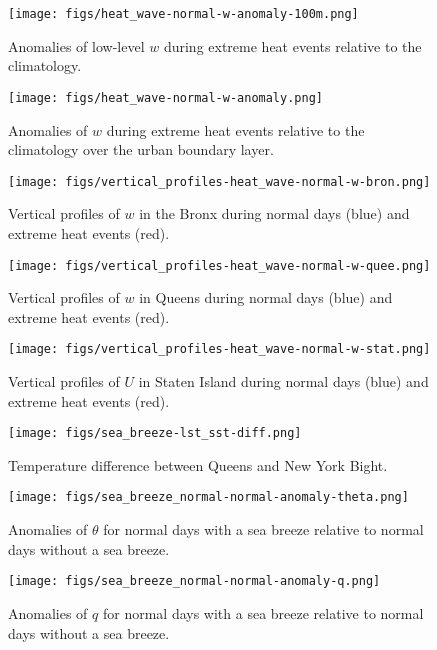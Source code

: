 \documentclass[11pt,a4paper]{article}
\begin{document}
\begin{figure}[ht]
	\centering
	\texttt{[image: figs/heat\_wave-normal-w-anomaly-100m.png]}
	\caption{Anomalies of low-level $w$ during extreme heat events relative to the climatology.}
	\label{fig:extreme-heat-normal-comparison-100m-w}
\end{figure}
\begin{figure}[ht]
	\centering
	\texttt{[image: figs/heat\_wave-normal-w-anomaly.png]}
	\caption{Anomalies of $w$ during extreme heat events relative to the climatology over the urban boundary layer.}
	\label{fig:extreme-heat-normal-comparison-contours-w}
\end{figure}
\begin{figure}[ht]
	\centering
	\texttt{[image: figs/vertical\_profiles-heat\_wave-normal-w-bron.png]}
	\caption{Vertical profiles of $w$ in the Bronx during normal days (blue) and extreme heat events (red).}
	\label{fig:extreme-heat-normal-vertical_profiles-w-bron}
\end{figure}
\begin{figure}[ht]
	\centering
	\texttt{[image: figs/vertical\_profiles-heat\_wave-normal-w-quee.png]}
	\caption{Vertical profiles of $w$ in Queens during normal days (blue) and extreme heat events (red).}
	\label{fig:extreme-heat-normal-vertical_profiles-w-quee}
\end{figure}

\begin{figure}[ht]
	\centering
	\texttt{[image: figs/vertical\_profiles-heat\_wave-normal-w-stat.png]}
	\caption{Vertical profiles of $U$ in Staten Island during normal days (blue) and extreme heat events (red).}
	\label{fig:extreme-heat-normal-vertical_profiles-w-stat}
\end{figure}

\begin{figure}[ht]
	\centering
	\texttt{[image: figs/sea\_breeze-lst\_sst-diff.png]}
	\caption{Temperature difference between Queens and New York Bight.}
	\label{fig:sea_breeze-lst_sst-diff}
\end{figure}

\begin{figure}[ht]
	\centering
	\texttt{[image: figs/sea\_breeze\_normal-normal-anomaly-theta.png]}
	\caption{Anomalies of $\theta$ for normal days with a sea breeze relative to normal days without a sea breeze.}
	\label{fig:sea_breeze_normal-normal-anomaly-theta}
\end{figure}
\begin{figure}[ht]
	\centering
	\texttt{[image: figs/sea\_breeze\_normal-normal-anomaly-q.png]}
	\caption{Anomalies of $q$ for normal days with a sea breeze relative to normal days without a sea breeze.}
	\label{fig:sea_breeze_normal-normal-anomaly-q}
\end{figure}
\end{document}
